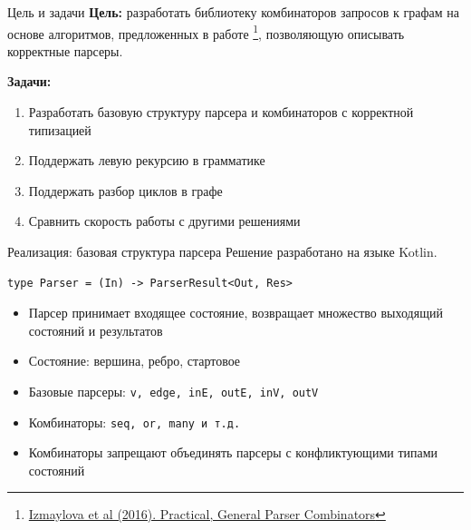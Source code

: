 \documentclass[aspectratio=169]{beamer}
\begin{document}
\begin{frame}{Цель и задачи}
  \textbf{Цель:} разработать библиотеку комбинаторов запросов к графам на основе алгоритмов, предложенных в работе \footnote[1]{\href{https://dl.acm.org/doi/10.1145/2847538.2847539}
    {Izmaylova et al (2016). Practical, General Parser Combinators}}, позволяющую описывать корректные парсеры.

  \textbf{Задачи:}
  \begin{enumerate}
    \item Разработать базовую структуру парсера и комбинаторов с корректной типизацией
    \item Поддержать левую рекурсию в грамматике
    \item Поддержать разбор циклов в графе
    \item Сравнить скорость работы с другими решениями
  \end{enumerate}
\end{frame}


\begin{frame}[fragile]{Реализация: базовая структура парсера}
  Решение разработано на языке Kotlin.
  \begin{verbatim}
type Parser = (In) -> ParserResult<Out, Res>
  \end{verbatim}
  \begin{itemize}
    \item Парсер принимает входящее состояние, возвращает множество выходящий состояний и результатов
    \item Состояние: вершина, ребро, стартовое
    \item Базовые парсеры: \texttt{v, edge, inE, outE, inV, outV}
    \item Комбинаторы: \texttt{seq, or, many и т.д.}
    \item Комбинаторы запрещают объединять парсеры с конфликтующими типами состояний
  \end{itemize}

\end{frame}
\end{document}
